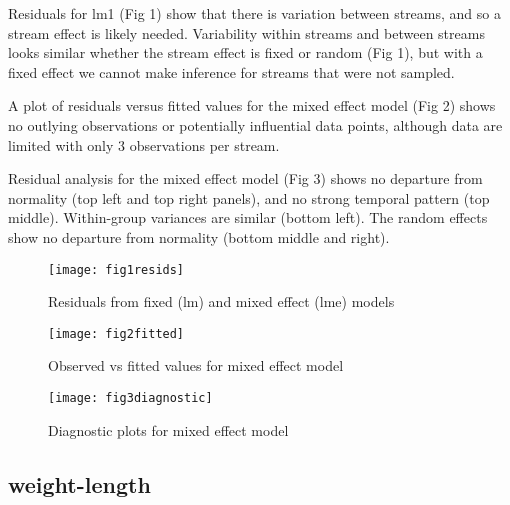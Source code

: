 \documentclass{article}
\begin{document}
Residuals for lm1 (Fig 1) show that there is variation between streams, and so a 
stream effect is likely needed. Variability within streams and between streams
looks similar whether the stream effect is fixed or random (Fig 1), but with a
fixed effect we cannot make inference for streams that were not sampled.

A plot of residuals versus fitted values for the mixed effect model (Fig 2) 
shows no outlying observations or potentially influential data points, although 
data are limited with only 3 observations per stream.

Residual analysis for the mixed effect model (Fig 3) shows no departure from
normality (top left and top right panels), and no strong temporal pattern
(top middle). Within-group variances are similar (bottom left). The random 
effects show no departure from normality (bottom middle and right).


\begin{figure}[!htbp]
  \centering
  \texttt{[image: fig1resids]}
  \caption{Residuals from fixed (lm) and mixed effect (lme) models}
\end{figure}

\begin{figure}[!htbp]
  \centering
  \texttt{[image: fig2fitted]}
  \caption{Observed vs fitted values for mixed effect model}
\end{figure}

\begin{figure}[!htpb]
  \centering
  \texttt{[image: fig3diagnostic]}
  \caption{Diagnostic plots for mixed effect model}
\end{figure}



\subsection{weight-length}
\end{document}
